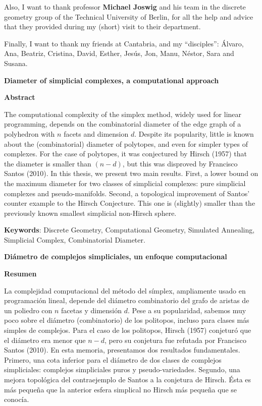 \documentclass[12pt,a4paper]{article}
\theoremstyle{plain}
\theoremstyle{definition}
\begin{document}
Also, I want to thank professor \textbf{Michael Joswig} and his team in the discrete geometry group of the Technical University of Berlin, for all the help and advice that they provided during my (short) visit to their department.

Finally, I want to thank my friends at Cantabria, and my ``disciples'': Álvaro, Ana, Beatriz, Cristina, David, Esther, Jesús, Jon, Manu, Néstor, Sara and Susana.

\newpage

\begin{center}
    \textbf{Diameter of simplicial complexes, a computational approach}
   
    \vspace{0.5cm}
    \textbf{Abstract}
\end{center}
The computational complexity of the simplex method, widely used for linear programming, depends on the combinatorial diameter of the edge graph of a polyhedron with $n$ facets and dimension $d$. Despite its popularity, little is known about the (combinatorial) diameter of polytopes, and even for simpler types of complexes. For the case of polytopes, it was conjectured by Hirsch (1957) that the diameter is smaller than $(n-d)$, but this was disproved by Francisco Santos (2010). In this thesis, we present two main results. First, a lower bound on the maximum diameter for two classes of simplicial complexes: pure simplicial complexes and pseudo-manifolds. Second, a topological improvement of Santos' counter example to the Hirsch Conjecture. This one is (slightly) smaller than the previously known smallest simplicial non-Hirsch sphere.
\vspace{1cm}

\textbf{Keywords}: Discrete Geometry, Computational Geometry, Simulated Annealing, Simplicial Complex, Combinatorial Diameter.

\vspace{2cm}

\begin{center}
  \textbf{Diámetro de complejos simpliciales, un enfoque computacional}
   
    \vspace{0.5cm}
    \textbf{Resumen}
\end{center} 
La complejidad computacional del método del símplex, ampliamente usado en programación lineal, depende del diámetro combinatorio del grafo de aristas de un poliedro con $n$ facetas y dimensión $d$. Pese a su popularidad, sabemos muy poco sobre el diámetro (combinatorio) de los politopos, incluso para clases más simples de complejos. Para el caso de los politopos, Hirsch (1957) conjeturó que el diámetro era menor que $n-d$, pero su conjetura fue refutada por Francisco Santos (2010). En esta memoria, presentamos dos resultados fundamentales. Primero, una cota inferior para el diámetro de dos clases de complejos simpliciales: complejos simpliciales puros y pseudo-variedades. Segundo, una mejora topológica del contraejemplo de Santos a la conjetura de Hirsch. Ésta es más pequeña que la anterior esfera simplical no Hirsch más pequeña que se conocía.
\vspace{1cm}
\end{document}
